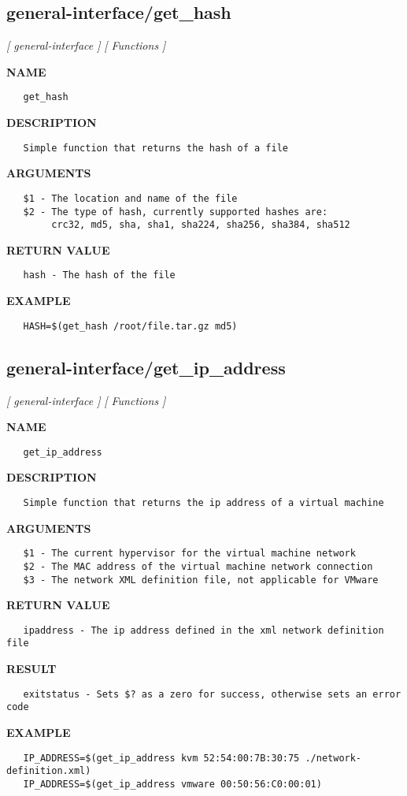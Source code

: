 \subsection{general-interface/get\_hash}
\textsl{[ general-interface ]}
\textsl{[ Functions ]}

\label{ch:robo32}
\label{ch:general_interface_get_hash}
\textbf{NAME}
\begin{verbatim}
   get_hash
\end{verbatim}
\textbf{DESCRIPTION}
\begin{verbatim}
   Simple function that returns the hash of a file
\end{verbatim}
\textbf{ARGUMENTS}
\begin{verbatim}
   $1 - The location and name of the file
   $2 - The type of hash, currently supported hashes are: 
        crc32, md5, sha, sha1, sha224, sha256, sha384, sha512
\end{verbatim}
\textbf{RETURN VALUE}
\begin{verbatim}
   hash - The hash of the file
\end{verbatim}
\textbf{EXAMPLE}
\begin{verbatim}
   HASH=$(get_hash /root/file.tar.gz md5)
\end{verbatim}
\newpage
\subsection{general-interface/get\_ip\_address}
\textsl{[ general-interface ]}
\textsl{[ Functions ]}

\label{ch:robo33}
\label{ch:general_interface_get_ip_address}
\textbf{NAME}
\begin{verbatim}
   get_ip_address
\end{verbatim}
\textbf{DESCRIPTION}
\begin{verbatim}
   Simple function that returns the ip address of a virtual machine
\end{verbatim}
\textbf{ARGUMENTS}
\begin{verbatim}
   $1 - The current hypervisor for the virtual machine network
   $2 - The MAC address of the virtual machine network connection
   $3 - The network XML definition file, not applicable for VMware
\end{verbatim}
\textbf{RETURN VALUE}
\begin{verbatim}
   ipaddress - The ip address defined in the xml network definition file
\end{verbatim}
\textbf{RESULT}
\begin{verbatim}
   exitstatus - Sets $? as a zero for success, otherwise sets an error code
\end{verbatim}
\textbf{EXAMPLE}
\begin{verbatim}
   IP_ADDRESS=$(get_ip_address kvm 52:54:00:7B:30:75 ./network-definition.xml)
   IP_ADDRESS=$(get_ip_address vmware 00:50:56:C0:00:01)
\end{verbatim}
\newpage
